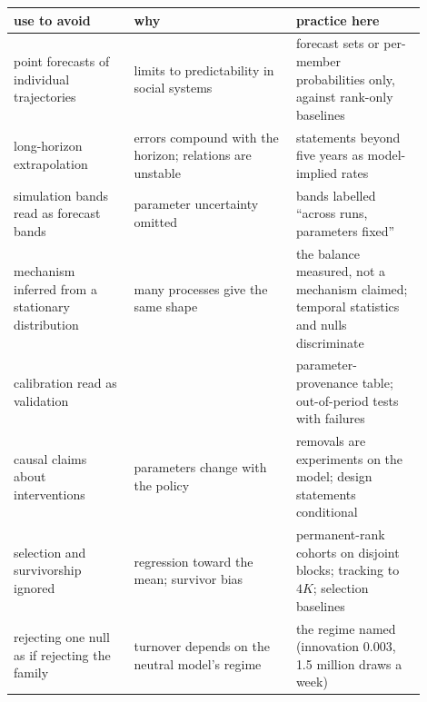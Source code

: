 \documentclass[10pt]{article}
\begin{document}
\begin{center}\footnotesize\begin{tabular}{>{\raggedright\arraybackslash}p{0.26\linewidth}>{\raggedright\arraybackslash}p{0.35\linewidth}>{\raggedright\arraybackslash}p{0.29\linewidth}}
\toprule
use to avoid & why & practice here \\
\midrule
point forecasts of individual trajectories & limits to predictability in social systems \cite{salganik2006,martin2016} & forecast sets or per-member probabilities only, against rank-only baselines \\
long-horizon extrapolation & errors compound with the horizon; relations are unstable \cite{keyfitz1981,stock1996} & statements beyond five years as model-implied rates \\
simulation bands read as forecast bands & parameter uncertainty omitted \cite{dietze2018} & bands labelled ``across runs, parameters fixed'' \\
mechanism inferred from a stationary distribution & many processes give the same shape \cite{stumpf2012,mcgill2007,clauset2009} & the balance measured, not a mechanism claimed; temporal statistics and nulls discriminate \\
calibration read as validation & \cite{oreskes1994} & parameter-provenance table; out-of-period tests with failures \\
causal claims about interventions & parameters change with the policy \cite{lucas1976,huszar2022} & removals are experiments on the model; design statements conditional \\
selection and survivorship ignored & regression toward the mean; survivor bias \cite{quah1993,brown1992,working1960} & permanent-rank cohorts on disjoint blocks; tracking to $4K$; selection baselines \\
rejecting one null as if rejecting the family & turnover depends on the neutral model's regime \cite{evans2011} & the regime named (innovation 0.003, 1.5 million draws a week) \\
\bottomrule
\end{tabular}\end{center}
\end{document}
